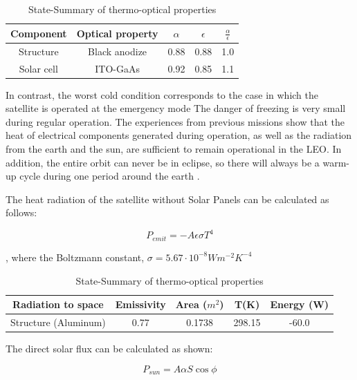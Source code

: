 \begin{table}[h!]
	\centering
	\begin{tabular}{c c c c c}
		\hline
		\textbf{Component} & \textbf{Optical property} & $\alpha$ & $\epsilon$ & $\frac{\alpha}{\epsilon}$ \\ \hline
		Structure & Black anodize & 0.88 & 0.88 & 1.0 \\ \hline
		Solar cell & ITO-GaAs & 0.92 & 0.85 & 1.1 \\ \hline
	\end{tabular}
	\caption{State-Summary of thermo-optical properties}
	\label{tab:passive_thermal}
\end{table}

In contrast, the worst cold condition corresponds to the case in which the satellite
is operated at the emergency mode
The danger of freezing is very small during regular operation. The experiences
from previous missions show that the heat of electrical components generated
during operation, as well as the radiation from the earth and the sun, are sufficient
to remain operational in the LEO. In addition, the entire orbit can never be in
eclipse, so there will always be a warm-up cycle during one period around the earth \cite{Hindawi}.

The heat radiation of the satellite without Solar Panels can be calculated as follows:

\begin{equation}
	P_{emit} = -A \epsilon \sigma T^4
\end{equation}

, where the Boltzmann constant, $\sigma = 5.67\cdot 10^{-8} W m^{-2} K^{-4}$

\begin{table}[h!]
	\centering
	\begin{tabular}{c c c c c}
		\hline
		\textbf{Radiation to space} & \textbf{Emissivity} & Area ($m^2$) & T(K) & Energy (W) \\ \hline
		Structure (Aluminum) & 0.77 & 0.1738 & 298.15 & -60.0 \\ \hline
	\end{tabular}
	\caption{State-Summary of thermo-optical properties}
	\label{tab:passive_thermal}
\end{table}

The direct solar flux can be calculated as shown:


\begin{equation}
	P_{sun} = A \alpha S \cos{\phi}
\end{equation}

